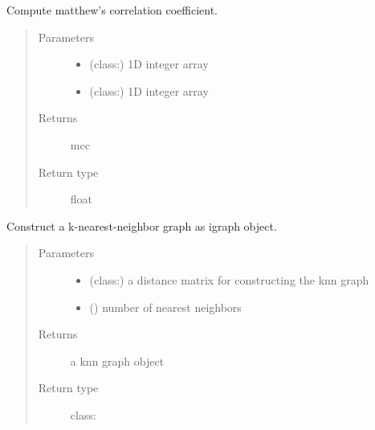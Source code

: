\documentclass[letterpaper,10pt,english]{sphinxmanual}
\begin{document}

\begin{fulllineitems}
\label{\detokenize{api:spaotsc.SpaOTsc.compute_mcc}}
Compute matthew’s correlation coefficient.
\begin{quote}\begin{description}
\item[{Parameters}] \leavevmode\begin{itemize}
\item {} 
 (class:) \textendash{} 1D integer array

\item {} 
 (class:) \textendash{} 1D integer array

\end{itemize}

\item[{Returns}] \leavevmode
mcc

\item[{Return type}] \leavevmode
float

\end{description}\end{quote}

\end{fulllineitems}


\begin{fulllineitems}
\label{\detokenize{api:spaotsc.SpaOTsc.knn_graph}}
Construct a k-nearest-neighbor graph as igraph object.
\begin{quote}\begin{description}
\item[{Parameters}] \leavevmode\begin{itemize}
\item {} 
 (class:) \textendash{} a distance matrix for constructing the knn graph

\item {} 
 () \textendash{} number of nearest neighbors

\end{itemize}

\item[{Returns}] \leavevmode
a knn graph object

\item[{Return type}] \leavevmode
class:

\end{description}\end{quote}

\end{fulllineitems}
\end{document}
